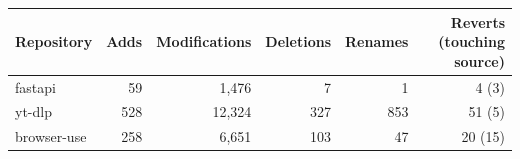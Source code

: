 \begin{tabular}{lrrrrr}
\toprule
Repository & Adds & Modifications & Deletions & Renames & Reverts (touching source) \\
\midrule
fastapi & 59 & 1,476 & 7 & 1 & 4 (3) \\
yt-dlp & 528 & 12,324 & 327 & 853 & 51 (5) \\
browser-use & 258 & 6,651 & 103 & 47 & 20 (15) \\
\bottomrule
\end{tabular}